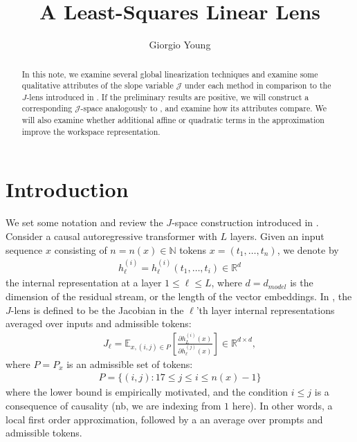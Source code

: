 \documentclass[10pt,oneside,reqno]{amsart}
\title{A Least-Squares Linear Lens}
\author[G. Young]{Giorgio Young}
\theoremstyle{definition}
\numberwithin{equation}{section}
\newcommand{\cJ}{{\mathcal{J}}}
\newcommand{\bbN}{\mathbb{N}}
\newcommand{\bbR}{\mathbb{R}}
\newcommand{\bbE}{\mathbb{E}}
\begin{document}
\begin{abstract}
In this note, we examine several global linearization techniques and examine some qualitative attributes of the slope variable $\cJ$ under each method in comparison to the $J$-lens introduced in \cite{gurnee2026jspace}. If the preliminary results are positive, we will construct a corresponding $\cJ$-space analogously to \cite{gurnee2026jspace}, and examine how its attributes compare. We will also examine whether additional affine or quadratic terms in the approximation improve the workspace representation.

\end{abstract}

\maketitle


\section{Introduction}

We set some notation and review the $J$-space construction introduced in \cite{gurnee2026jspace}. Consider a causal autoregressive transformer with $L$ layers. Given an input sequence $x$ consisting of $n=n(x)\in \bbN$ tokens $x=(t_1,\dots,t_n)$, we denote by 
\begin{align*}
h_\ell^{(i)}=h_\ell^{(i)}(t_1,\dots,t_i)\in \mathbb R^d
\end{align*}
the internal representation at a layer $1\leq \ell\leq L$, where $d=d_{model}$ is the dimension of the residual stream, or the length of the vector embeddings. In \cite{gurnee2026jspace}, the $J$-lens is defined to be the Jacobian in the $\ell$'th layer internal representations averaged over inputs and admissible tokens:
\begin{align*}
J_\ell=\bbE_{x,(i,j)\in P}\left[\frac{\partial h_{L}^{(i)}(x)}{\partial h_{\ell}^{(j)}(x)}\right]\in \bbR^{d\times d},
\end{align*}
where $P=P_x$ is an admissible set of tokens:
\begin{align*}
P=\{(i,j): 17\leq j\leq i\leq n(x)-1\}
\end{align*}
where the lower bound is empirically motivated, and the condition $i\leq j$ is a consequence of causality (nb, we are indexing from $1$ here). In other words, a local first order approximation, followed by a an average over prompts and admissible tokens. 
\end{document}
